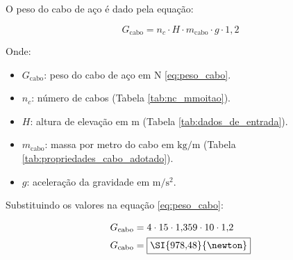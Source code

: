 O peso do cabo de aço é dado pela equação:

\begin{equation}
  G_{\text{cabo}} = n_c \cdot H \cdot m_{\text{cabo}} \cdot g \cdot 1{,}2
  \label{eq:peso_cabo}
\end{equation}

Onde:

\begin{itemize}[leftmargin=1.25cm]
  \item $G_{\text{cabo}}$: peso do cabo de aço em $\si{\newton}$ \eqref{eq:peso_cabo}.
  \item $n_c$: número de cabos (Tabela \ref{tab:nc_mmoitao}).
  \item $H$: altura de elevação em $\si{\meter}$ (Tabela \ref{tab:dados_de_entrada}).
  \item $m_{\text{cabo}}$: massa por metro do cabo em $\si{\kilo\gram/\meter}$ (Tabela \ref{tab:propriedades_cabo_adotado}).
  \item $g$: aceleração da gravidade em $\si{\meter\per\second\squared}$.
\end{itemize}

\vspace{1em}

Substituindo os valores na equação \eqref{eq:peso_cabo}:

\begin{align*}
  G_{\text{cabo}} & = 4 \cdot 15 \cdot 1{,}359 \cdot 10 \cdot 1{,}2 \\
  G_{\text{cabo}} & = \boxed{\SI{978{,}48}{\newton}}
\end{align*}
